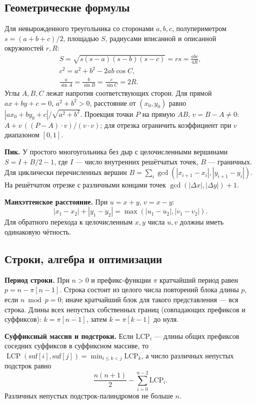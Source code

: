 \subsection{Геометрические формулы}
Для невырожденного треугольника со сторонами $a,b,c$, полупериметром $s=(a+b+c)/2$, площадью $S$, радиусами вписанной и описанной окружностей $r,R$:
\[
  \begin{gathered}
    S=\sqrt{s(s-a)(s-b)(s-c)}=rs=\frac{abc}{4R},\\
    c^2=a^2+b^2-2ab\cos C,\\
    \frac a{\sin A}=\frac b{\sin B}=\frac c{\sin C}=2R.
  \end{gathered}
\]
Углы $A,B,C$ лежат напротив соответствующих сторон.
Для прямой $ax+by+c=0$, $a^2+b^2>0$, расстояние от $(x_0,y_0)$ равно $|ax_0+by_0+c|/\sqrt{a^2+b^2}$.
Проекция точки $P$ на прямую $AB$, $v=B-A\ne0$:
$A+v\,((P-A)\cdot v)/(v\cdot v)$; для отрезка ограничить коэффициент при $v$ диапазоном $[0,1]$.

\textbf{Пик.} У простого многоугольника без дыр с целочисленными вершинами $S=I+B/2-1$, где $I$ --- число внутренних решётчатых точек, $B$ --- граничных.
Для циклически перечисленных вершин
$B=\sum_i\gcd(|x_{i+1}-x_i|,|y_{i+1}-y_i|)$.
На решётчатом отрезке с различными концами точек $\gcd(|\Delta x|,|\Delta y|)+1$.

\textbf{Манхэттенское расстояние.} При $u=x+y$, $v=x-y$:
\[
  |x_1-x_2|+|y_1-y_2|
  =\max(|u_1-u_2|,|v_1-v_2|).
\]
Для обратного перехода к целочисленным $x,y$ числа $u,v$ должны иметь одинаковую чётность.

\subsection{Строки, алгебра и оптимизации}
\textbf{Период строки.} При $n>0$ и префикс-функции $\pi$ кратчайший период равен $p=n-\pi[n-1]$. Строка состоит из целого числа повторений блока длины $p$, если $n\bmod p=0$; иначе кратчайший блок для такого представления --- вся строка.
Длины всех непустых собственных границ (совпадающих префиксов и суффиксов): $k=\pi[n-1]$, затем $k=\pi[k-1]$ до нуля.

\textbf{Суффиксный массив и подстроки.} Если $\mathrm{LCP}_i$ --- длины общих префиксов соседних суффиксов в суффиксном массиве, то $\operatorname{LCP}(\text{suf}[i],\text{suf}[j])=\min_{i\le k<j}\mathrm{LCP}_k$, а число различных непустых подстрок равно
\[
  \frac{n(n+1)}2-\sum_{i=0}^{n-2}\mathrm{LCP}_i.
\]
Различных непустых подстрок-палиндромов не больше $n$.

